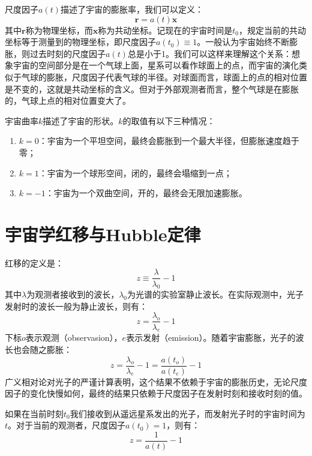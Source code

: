 \documentclass[fontset=none,openany,a4paper]{ctexbook}
\begin{document}
尺度因子$a(t)$描述了宇宙的膨胀率，我们可以定义：
\begin{equation}
    \bm{r} = a(t)\bm{x}
\end{equation}
其中$\bm{r}$称为物理坐标，而$\bm{x}$称为共动坐标。记现在的宇宙时间是$t_0$，规定当前的共动坐标等于测量到的物理坐标，即尺度因子$a(t_0) \equiv 1$。一般认为宇宙始终不断膨胀，则过去时刻的尺度因子$a(t)$总是小于1。我们可以这样来理解这个关系：想象宇宙的空间部分是在一个气球上面，星系可以看作球面上的点，而宇宙的演化类似于气球的膨胀，尺度因子代表气球的半径。对球面而言，球面上的点的相对位置是不变的，这就是共动坐标的含义。但对于外部观测者而言，整个气球是在膨胀的，气球上点的相对位置变大了。


宇宙曲率$k$描述了宇宙的形状。$k$的取值有以下三种情况：
\begin{enumerate}
    \item $k = 0$：宇宙为一个平坦空间，最终会膨胀到一个最大半径，但膨胀速度趋于零；
    \item $k = 1$：宇宙为一个球形空间，闭的，最终会塌缩到一点；
    \item $k = -1$：宇宙为一个双曲空间，开的，最终会无限加速膨胀。
\end{enumerate}

\section{宇宙学红移与Hubble定律}

红移的定义是：
\begin{equation}
    z \equiv \frac{\lambda}{\lambda_0} - 1
\end{equation}
其中$\lambda$为观测者接收到的波长，$\lambda_0$为光谱的实验室静止波长。在实际观测中，光子发射时的波长一般为静止波长，则有：
\begin{equation}
    z = \frac{\lambda_o}{\lambda_e} - 1
\end{equation}
下标$o$表示观测（observasion），$e$表示发射（emission）。随着宇宙膨胀，光子的波长也会随之膨胀：
\begin{equation}
    z = \frac{\lambda_o}{\lambda_e} - 1 = \frac{a(t_o)}{a(t_e)} - 1
\end{equation}
广义相对论对光子的严谨计算表明，这个结果不依赖于宇宙的膨胀历史，无论尺度因子的变化快慢如何，最终的结果只依赖于尺度因子在发射时刻和接收时刻的值。

如果在当前时刻$t_0$我们接收到从遥远星系发出的光子，而发射光子时的宇宙时间为$t$。对于当前的观测者，尺度因子$a(t_0) = 1$，则有：
\begin{equation}
    z = \frac{1}{a(t)} - 1
\end{equation}
\end{document}
